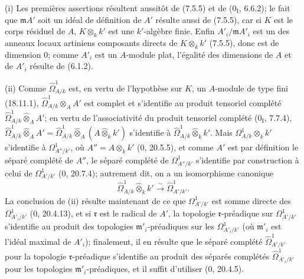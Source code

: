
(i) Les premières assertions résultent aussitôt de (7.5.5) et de ($0_{\mathrm I}$, 6.6.2); le fait que $\mathfrak mA'$ soit un idéal de définition de $A'$ résulte aussi de (7.5.5), car si $K$ est le corps résiduel de $A$, $K\otimes_k k'$ est une $k'$-algèbre finie. Enfin $A'_i/\mathfrak mA'_i$ est un des anneaux locaux artiniens composants directs de $K\otimes_k k'$ (7.5.5), donc est de dimension 0; comme $A'_i$ est un $A$-module plat, l'égalité des dimensions de $A$ et de $A'_i$ résulte de (6.1.2).

(ii) Comme $\hat{\Omega}^1_{A/k}$ est, en vertu de l'hypothèse sur $K$, un $A$-module de type fini (18.11.1), $\hat{\Omega}^1_{A/k}\otimes_A A'$ est complet et s'identifie au produit tensoriel complété $\hat{\Omega}^1_{A/k}\widehat{\otimes}_A A'$; en vertu de l'associativité du produit tensoriel complété ($0_{\mathrm I}$, 7.7.4), $\hat{\Omega}^1_{A/k}\widehat{\otimes}_A A'=\hat{\Omega}^1_{A/k}\widehat{\otimes}_A(A\widehat{\otimes}_k k')$ s'identifie à $\hat{\Omega}^1_{A/k}\widehat{\otimes}_k k'$. Mais $\Omega^1_{A/k}\otimes_k k'$ s'identifie à $\Omega^1_{A''/k'}$, où $A''=A\otimes_k k'$ (0, 20.5.5), et comme $A'$ est par définition le séparé complété de $A''$, le séparé complété de $\Omega^1_{A''/k'}$ s'identifie par construction à celui de $\Omega^1_{A'/k'}$ (0, 20.7.4); autrement dit, on a un isomorphisme canonique
\[
  \hat{\Omega}^1_{A/k}\widehat{\otimes}_k k'\xrightarrow{\sim}\hat{\Omega}^1_{A'/k'}.
\]
La conclusion de (ii) résulte maintenant de ce que $\Omega^1_{A'/k'}$ est somme directe des $\Omega^1_{A'_i/k'}$ (0, 20.4.13), et si $\mathfrak r$ est le radical de $A'$, la topologie $\mathfrak r$-préadique sur $\Omega^1_{A'/k'}$ s'identifie au produit des topologies $\mathfrak m'_i$-préadiques sur les $\Omega^1_{A'_i/k'}$ (où $\mathfrak m'_i$ est l'idéal maximal de $A'_i$); finalement, il en résulte que le séparé complété $\hat{\Omega}^1_{A'/k'}$ pour la topologie $\mathfrak r$-préadique s'identifie au produit des séparés complétés $\hat{\Omega}^1_{A'_i/k'}$ pour les topologies $\mathfrak m'_i$-préadiques, et il suffit d'utiliser (0, 20.4.5).

